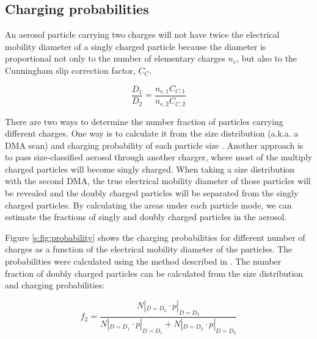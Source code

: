 \documentclass[12pt]{article}
\begin{document}
\subsection{Charging probabilities}
An aerosol particle carrying two charges will not have twice the electrical mobility diameter of a singly charged particle because the diameter is proportional not only to the number of elementary charges $n_e$, but also to the Cunningham slip correction factor, $C_C$.

\begin{equation}
    \frac{D_1}{D_2}=\frac{n_{e,1}C_{C,1}}{n_{e,2}C_{C,2}}
\end{equation}

\noindent There are two ways to determine the number fraction of particles carrying different charges. One way is to calculate it from the size distribution (a.k.a. a DMA scan) and charging probability of each particle size \citep{RN10}. Another approach is to pass size-classified aerosol through another charger, where most of the multiply charged particles will become singly charged. When taking a size distribution with the second DMA, the true electrical mobility diameter of those particles will be revealed and the doubly charged particles will be separated from the singly charged particles. By calculating the areas under each particle mode, we can estimate the fractions of singly and doubly charged particles in the aerosol.

Figure \ref{s:fig:probability} shows the charging probabilities for different number of charges as a function of the electrical mobility diameter of the particles. The probabilities were calculated using the method described in \citep{RN10}. The number fraction of doubly charged particles can be calculated from the size distribution and charging probabilities:

\begin{equation}
    f_2=\frac{N|_{D=D_2}\cdot p|_{D=D_2}}{N|_{D=D_1}\cdot p|_{D=D_1}+N|_{D=D_2}\cdot p|_{D=D_2}}
\end{equation}
\end{document}
